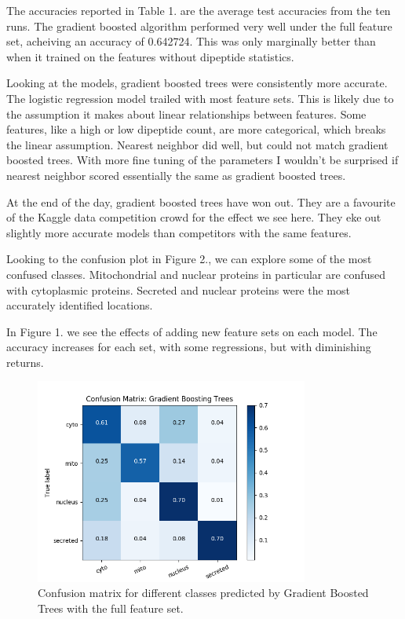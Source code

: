 \documentclass{bioinfo}
\begin{document}
The accuracies reported in Table 1. are the average test accuracies from the ten runs.
The gradient boosted algorithm performed very well under the full feature set, acheiving an accuracy of 0.642724.
This was only marginally better than when it trained on the features without dipeptide statistics.

Looking at the models, gradient boosted trees were consistently more accurate.
The logistic regression model trailed with most feature sets.
This is likely due to the assumption it makes about linear relationships between features.
Some features, like a high or low dipeptide count, are more categorical, which breaks the linear assumption.
Nearest neighbor did well, but could not match gradient boosted trees.
With more fine tuning of the parameters I wouldn't be surprised if nearest neighbor scored essentially the same as gradient boosted trees.

At the end of the day, gradient boosted trees have won out.
They are a favourite of the Kaggle data competition crowd for the effect we see here.
They eke out slightly more accurate models than competitors with the same features.

Looking to the confusion plot in Figure 2., we can explore some of the most confused classes.
Mitochondrial and nuclear proteins in particular are confused with cytoplasmic proteins.
Secreted and nuclear proteins were the most accurately identified locations.

In Figure 1. we see the effects of adding new feature sets on each model.
The accuracy increases for each set, with some regressions, but with diminishing returns.

\begin{figure}[H]
  \includegraphics[width=9cm]{confusion}
  \caption{Confusion matrix for different classes predicted by Gradient Boosted Trees with the full feature set.}
\end{figure}
\end{document}
